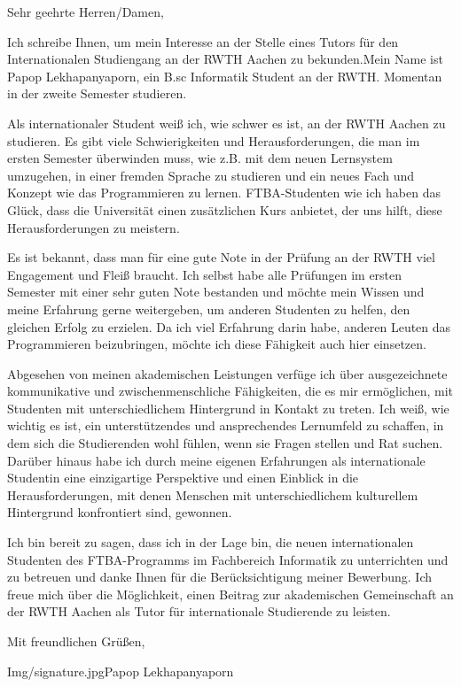 Sehr geehrte Herren/Damen,
\vspace{0.2in}
\par
Ich schreibe Ihnen, um mein Interesse an der Stelle eines Tutors für den Internationalen Studiengang an der RWTH Aachen zu bekunden.Mein Name ist Papop Lekhapanyaporn, ein B.sc Informatik Student an der RWTH. Momentan in der zweite Semester studieren.
\vspace{0.2in}\par
Als internationaler Student weiß ich, wie schwer es ist, an der RWTH Aachen zu studieren. Es gibt viele Schwierigkeiten und Herausforderungen, die man im ersten Semester überwinden muss, wie z.B. mit dem neuen Lernsystem umzugehen, in einer fremden Sprache zu studieren und ein neues Fach und Konzept wie das Programmieren zu lernen. FTBA-Studenten wie ich haben das Glück, dass die Universität einen zusätzlichen Kurs anbietet, der uns hilft, diese Herausforderungen zu meistern.
\vspace{0.2in}\par
Es ist bekannt, dass man für eine gute Note in der Prüfung an der RWTH viel Engagement und Fleiß braucht. Ich selbst habe alle Prüfungen im ersten Semester mit einer sehr guten Note bestanden und möchte mein Wissen und meine Erfahrung gerne weitergeben, um anderen Studenten zu helfen, den gleichen Erfolg zu erzielen. Da ich viel Erfahrung darin habe, anderen Leuten das Programmieren beizubringen, möchte ich diese Fähigkeit auch hier einsetzen. 
\vspace{0.2in}\par
Abgesehen von meinen akademischen Leistungen verfüge ich über ausgezeichnete kommunikative und zwischenmenschliche Fähigkeiten, die es mir ermöglichen, mit Studenten mit unterschiedlichem Hintergrund in Kontakt zu treten. Ich weiß, wie wichtig es ist, ein unterstützendes und ansprechendes Lernumfeld zu schaffen, in dem sich die Studierenden wohl fühlen, wenn sie Fragen stellen und Rat suchen. Darüber hinaus habe ich durch meine eigenen Erfahrungen als internationale Studentin eine einzigartige Perspektive und einen Einblick in die Herausforderungen, mit denen Menschen mit unterschiedlichem kulturellem Hintergrund konfrontiert sind, gewonnen.
\vspace{0.2in}\par
Ich bin bereit zu sagen, dass ich in der Lage bin, die neuen internationalen Studenten des FTBA-Programms im Fachbereich Informatik zu unterrichten und zu betreuen und danke Ihnen für die Berücksichtigung meiner Bewerbung. Ich freue mich über die Möglichkeit, einen Beitrag zur akademischen Gemeinschaft an der RWTH Aachen als Tutor für internationale Studierende zu leisten.
\begin{flushright}
  Mit freundlichen Grüßen,
  \signature{width=5cm}{Img/signature.jpg}{Papop Lekhapanyaporn}
\end{flushright}

